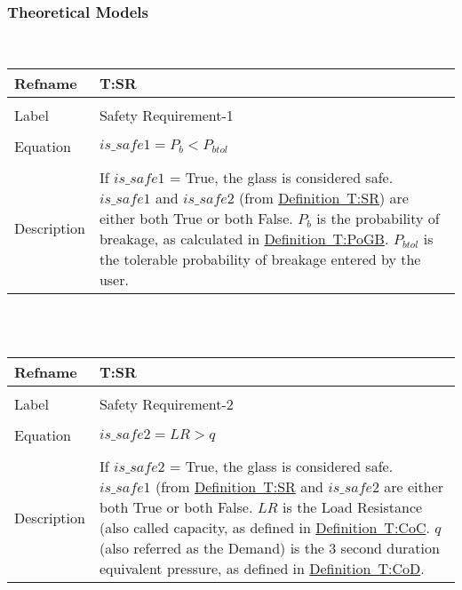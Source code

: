 \documentclass[12pt]{article}
\begin{document}
\subsubsection{Theoretical Models}
\label{Sec:TMs}
~\newline
\noindent \begin{minipage}{\textwidth}
\begin{tabular}{p{} p{}}
\toprule \textbf{Refname} & \textbf{T:SR}
\label{T:SR}
\\ \midrule \\
Label & Safety Requirement-1
\\ \midrule \\
Equation & $is\_safe1=P_{b}<P_{btol}$
\\ \midrule \\
Description & If $is\_safe1$ = True, the glass is considered safe. $is\_safe1$ and $is\_safe2$ (from \hyperref[T:SR]{Definition~T:SR}) are either both True or both False. $P_{b}$ is the probability of breakage, as calculated in \hyperref[T:PoGB]{Definition~T:PoGB}. $P_{btol}$ is the tolerable probability of breakage entered by the user.
\\ \bottomrule \end{tabular}
\end{minipage}\\
~\newline
\noindent \begin{minipage}{\textwidth}
\begin{tabular}{p{} p{}}
\toprule \textbf{Refname} & \textbf{T:SR}
\label{T:SR}
\\ \midrule \\
Label & Safety Requirement-2
\\ \midrule \\
Equation & $is\_safe2=LR>q$
\\ \midrule \\
Description & If $is\_safe2$ = True, the glass is considered safe. $is\_safe1$ (from \hyperref[T:SR]{Definition~T:SR} and $is\_safe2$ are either both True or both False. $LR$ is the Load Resistance (also called capacity, as defined in \hyperref[T:CoC]{Definition~T:CoC}. $q$ (also referred as the Demand) is the 3 second duration equivalent pressure, as defined in \hyperref[T:CoD]{Definition~T:CoD}.
\\ \bottomrule \end{tabular}
\end{minipage}\\
\end{document}
